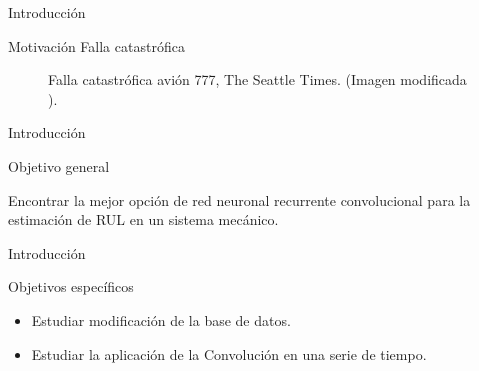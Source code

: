 \begin{frame}{Introducción}
\begin{block}{Motivación}
Falla catastrófica
\begin{figure}
  \centering
  \qquad
  \caption{Falla catastrófica avión 777, The Seattle Times. (Imagen modificada \cite{engine777}).}
  
\end{figure}
\end{block}
\end{frame}



\begin{frame}{Introducción}

\begin{block}{Objetivo general}

Encontrar la mejor opción de red neuronal recurrente convolucional para la estimación de RUL en un sistema mecánico.
\end{block}
   
\end{frame}

\begin{frame}{Introducción}


\begin{block}{Objetivos específicos}

\begin{itemize}
    \item Estudiar modificación de la base de datos.
    \item Estudiar la aplicación de la Convolución en una serie de tiempo.
\end{itemize}
\end{block}
\end{frame}

